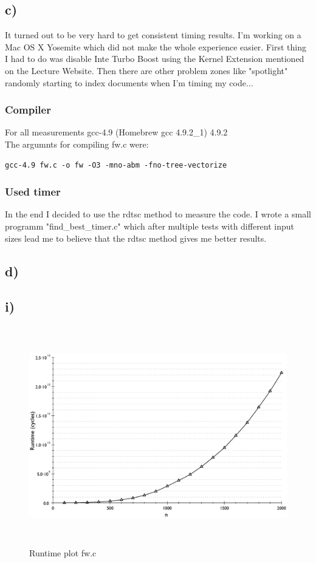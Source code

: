 \documentclass[10pt,a4paper,oneside,notitlepage]{report}
\begin{document}
\subsection*{c)}
It turned out to be very hard to get consistent timing results. I'm working on a Mac OS X Yosemite which did not make the whole experience easier. First thing I had to do was disable Inte Turbo Boost using the Kernel Extension mentioned on the Lecture Website. Then there are other problem zones like "spotlight" randomly starting to index  documents when I'm timing my code... 

\subsubsection*{Compiler}
For all measurements gcc-4.9 (Homebrew gcc 4.9.2\_1) 4.9.2 \\
The argumnts for compiling fw.c were:\\
\begin{verbatim}
gcc-4.9 fw.c -o fw -O3 -mno-abm -fno-tree-vectorize
\end{verbatim}

\subsubsection*{Used timer}
In the end I decided to use the rdtsc method to measure the code. I wrote a small programm "find\_best\_timer.c" which after multiple tests with different input sizes lead me to believe that the rdtsc method gives me better results.

\subsection*{d)}
\subsection*{i)}
\begin{figure}[H]
\caption{Runtime plot fw.c}
\includegraphics[height=9.5cm]{fw_runtime}
\end{figure}
\end{document}
